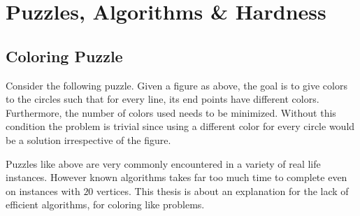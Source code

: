 

\chapter{Puzzles, Algorithms \& Hardness} 


\label{ch:puzz-algo-hard}
\section{Coloring Puzzle}

\begin{figure}[h] \label{fig:graph}
\centering 
{} 
\end{figure}

Consider the following puzzle. Given a figure
as above, the goal is to give colors to the circles such that
for every line, its end points have different colors. Furthermore, the number of
colors used needs to be minimized. Without this condition the problem is
trivial since using a different color for every circle would be a solution
irrespective of the figure.

Puzzles like above are very commonly encountered in a variety of real life
instances. However known algorithms takes far too much time to complete even on
instances with $20$ vertices. This thesis is about an explanation for the
lack of efficient algorithms, for coloring like problems.

